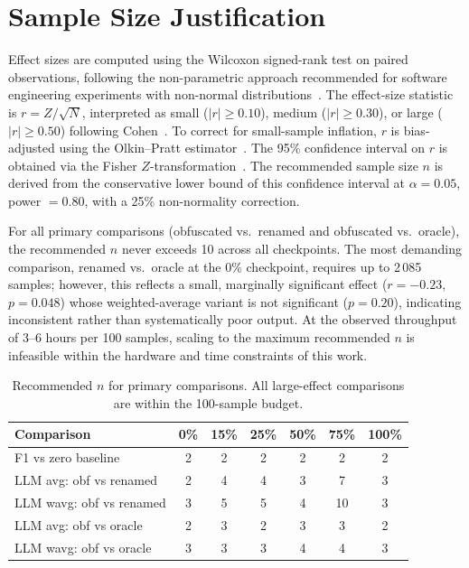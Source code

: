 \documentclass[conference]{IEEEtran}
\begin{document}
\section{Sample Size Justification}
\label{app:samplesize}

Effect sizes are computed using the Wilcoxon signed-rank test on paired
observations, following the non-parametric approach recommended for software
engineering experiments with non-normal
distributions~\cite{arcuri2011practical}.
The effect-size statistic is $r = Z/\sqrt{N}$, interpreted as small
($|r|\geq 0.10$), medium ($|r|\geq 0.30$), or large ($|r|\geq 0.50$) following
Cohen~\cite{cohen1988statistical}.
To correct for small-sample inflation, $r$ is bias-adjusted using the
Olkin--Pratt estimator~\cite{olkin1958unbiased}.
The 95\% confidence interval on $r$ is obtained via the Fisher
$Z$-transformation~\cite{fisher1915frequency}.
The recommended sample size $n$ is derived from the conservative lower bound of
this confidence interval at $\alpha = 0.05$, power $= 0.80$, with a 25\%
non-normality correction.

For all primary comparisons (obfuscated vs.\ renamed and obfuscated vs.\
oracle), the recommended $n$ never exceeds 10 across all checkpoints.
The most demanding comparison, renamed vs.\ oracle at the 0\% checkpoint,
requires up to 2\,085 samples; however, this reflects a small, marginally
significant effect ($r=-0.23$, $p=0.048$) whose weighted-average variant is not
significant ($p=0.20$), indicating inconsistent rather than systematically poor
output.
At the observed throughput of 3--6 hours per 100 samples, scaling to the
maximum recommended $n$ is infeasible within the hardware and time constraints
of this work.

\begin{table}[t]
  \centering
  \caption{Recommended $n$ for primary comparisons. All large-effect
           comparisons are within the 100-sample budget.}
  \label{tab:effect-primary}
  \begin{tabular}{lcccccc}
    \toprule
    \textbf{Comparison} & \textbf{0\%} & \textbf{15\%} & \textbf{25\%} &
    \textbf{50\%} & \textbf{75\%} & \textbf{100\%} \\
    \midrule
    F1 vs zero baseline       & 2 & 2 & 2 & 2 &  2 & 2 \\
    LLM avg: obf vs renamed   & 2 & 4 & 4 & 3 &  7 & 3 \\
    LLM wavg: obf vs renamed  & 3 & 5 & 5 & 4 & 10 & 3 \\
    LLM avg: obf vs oracle    & 2 & 3 & 2 & 3 &  3 & 2 \\
    LLM wavg: obf vs oracle   & 3 & 3 & 3 & 4 &  4 & 3 \\
    \bottomrule
  \end{tabular}
\end{table}
\end{document}
